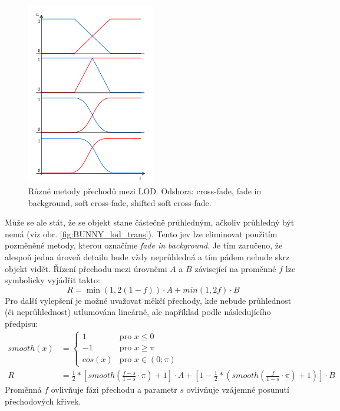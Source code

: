 \begin{figure}[!h]
\begin{center}
\includegraphics[width=0.5\textwidth]{./figures/fade_techniques.png}
\caption[Různé přechody mezi LOD]%
{Různé metody přechodů mezi LOD. Odshora: cross-fade, fade in background, soft cross-fade, shifted soft cross-fade.\label{fig:lodTrans}
}
\end{center}
\end{figure}
\pagebreak

Může se ale stát, že se objekt stane částečně průhledným, ačkoliv průhledný být nemá (viz obr. \ref{fig:BUNNY_lod_trans}). Tento jev lze eliminovat použitím pozměněné metody, kterou označíme \emph{fade in background}. Je tím zaručeno, že alespoň jedna úroveň detailu bude vždy neprůhledná a tím pádem nebude skrz objekt vidět. Řízení přechodu mezi úrovněmi $A$ a $B$ závisející na proměnné $f$ lze symbolicky vyjádřit takto:
\begin{equation} 
R = \min(1, 2(1-f)) \cdot A + min(1,2f) \cdot B 
\end{equation}
Pro další vylepšení je možné uvažovat měkčí přechody, kde nebude průhlednost (či neprůhlednost) utlumována lineárně, ale například podle následujícího předpisu:
\begin{align}
smooth(x)&= 
\begin{cases} 
1 & \text{pro } x\le0
\\
-1 & \text{pro } x\ge\pi
\\
cos(x) & \text{pro } x\in(0;\pi)
\end{cases}\nonumber\\
R &= \frac{1}{2} * \left [ smooth\left ( \frac{f-s}{1-s} \cdot \pi \right ) +1\right ] \cdot A + \left [ 1 - \frac{1}{2} * \left ( smooth\left ( \frac{f}{1-s} \cdot \pi \right )+1\right )  \right ]\cdot B
\end{align}
Proměnná $f$ ovlivňuje fázi přechodu a parametr $s$ ovlivňuje vzájemné posunutí přechodových křivek.

